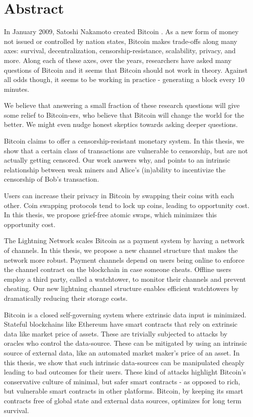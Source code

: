 
\chapter*{Abstract}

In January 2009, Satoshi Nakamoto created Bitcoin \cite{bitcoin_whitepaper}. As a new form of money not issued or controlled by nation states, Bitcoin makes trade-offs along many axes: survival, decentralization, censorship-resistance, scalability, privacy, and more. Along each of these axes, over the years, researchers have asked many questions of Bitcoin and it seems that Bitcoin should not work in theory. Against all odds though, it seems to be working in practice - generating a block every 10 minutes.

We believe that answering a small fraction of these research questions will give some relief to Bitcoin-ers, who believe that Bitcoin will change the world for the better. We might even nudge honest skeptics towards asking deeper questions.

Bitcoin claims to offer a censorship-resistant monetary system. In this thesis, we show that a certain class of transactions are vulnerable to censorship, but are not actually getting censored. Our work answers why, and points to an intrinsic relationship between weak miners and Alice's (in)ability to incentivize the censorship of Bob's transaction.

Users can increase their privacy in Bitcoin by swapping their coins with each other. Coin swapping protocols tend to lock up coins, leading to opportunity cost. In this thesis, we propose grief-free atomic swaps, which minimizes this opportunity cost. 

The Lightning Network scales Bitcoin as a payment system by having a network of channels. In this thesis, we propose a new channel structure that makes the network more robust. Payment channels depend on users being online to enforce the channel contract on the blockchain in case someone cheats. Offline users employ a third party, called a watchtower, to monitor their channels and prevent cheating. Our new lightning channel structure enables efficient watchtowers by dramatically reducing their storage costs. 

Bitcoin is a closed self-governing system where extrinsic data input is minimized. Stateful blockchains like Ethereum have smart contracts that rely on extrinsic data like market price of assets. These are trivially subjected to attacks by oracles who control the data-source. These can be mitigated by using an intrinsic source of external data, like an automated market maker's price of an asset. In this thesis, we show that such intrinsic data-sources can be manipulated cheaply leading to bad outcomes for their users. These kind of attacks highlight Bitcoin's conservative culture of minimal, but safer smart contracts - as opposed to rich, but vulnerable smart contracts in other platforms. Bitcoin, by keeping its smart contracts free of global state and external data sources, optimizes for long term survival.